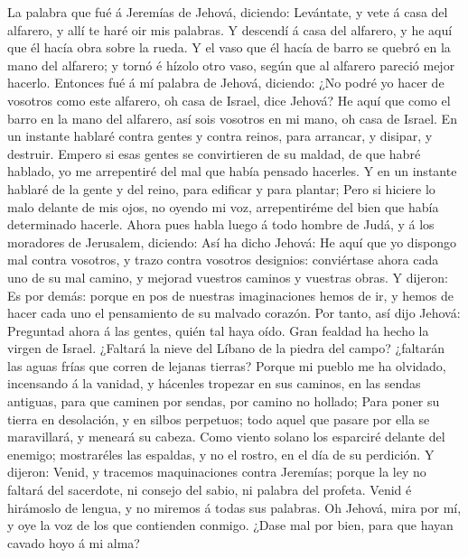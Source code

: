  La palabra que fué á Jeremías de Jehová, diciendo:
 Levántate, y vete á casa del alfarero, y allí te haré oir
mis palabras.  Y descendí á casa del alfarero, y he aquí que
él hacía obra sobre la rueda.  Y el vaso que él hacía de
barro se quebró en la mano del alfarero; y tornó é hízolo otro vaso,
según que al alfarero pareció mejor hacerlo.  Entonces fué á
mí palabra de Jehová, diciendo:  ¿No podré yo hacer de
vosotros como este alfarero, oh casa de Israel, dice Jehová? He aquí que
como el barro en la mano del alfarero, así sois vosotros en mi mano, oh
casa de Israel.  En un instante hablaré contra gentes y
contra reinos, para arrancar, y disipar, y destruir.  Empero
si esas gentes se convirtieren de su maldad, de que habré hablado, yo me
arrepentiré del mal que había pensado hacerles.  Y en un
instante hablaré de la gente y del reino, para edificar y para plantar;
 Pero si hiciere lo malo delante de mis ojos, no oyendo mi
voz, arrepentiréme del bien que había determinado hacerle. 
Ahora pues habla luego á todo hombre de Judá, y á los moradores de
Jerusalem, diciendo: Así ha dicho Jehová: He aquí que yo dispongo mal
contra vosotros, y trazo contra vosotros designios: conviértase ahora
cada uno de su mal camino, y mejorad vuestros caminos y vuestras obras.
 Y dijeron: Es por demás: porque en pos de nuestras
imaginaciones hemos de ir, y hemos de hacer cada uno el pensamiento de
su malvado corazón.  Por tanto, así dijo Jehová: Preguntad
ahora á las gentes, quién tal haya oído. Gran fealdad ha hecho la virgen
de Israel.  ¿Faltará la nieve del Líbano de la piedra del
campo? ¿faltarán las aguas frías que corren de lejanas tierras?
 Porque mi pueblo me ha olvidado, incensando á la vanidad,
y hácenles tropezar en sus caminos, en las sendas antiguas, para que
caminen por sendas, por camino no hollado;  Para poner su
tierra en desolación, y en silbos perpetuos; todo aquel que pasare por
ella se maravillará, y meneará su cabeza.  Como viento
solano los esparciré delante del enemigo; mostraréles las espaldas, y no
el rostro, en el día de su perdición.  Y dijeron: Venid, y
tracemos maquinaciones contra Jeremías; porque la ley no faltará del
sacerdote, ni consejo del sabio, ni palabra del profeta. Venid é
hirámoslo de lengua, y no miremos á todas sus palabras.  Oh
Jehová, mira por mí, y oye la voz de los que contienden conmigo.
 ¿Dase mal por bien, para que hayan cavado hoyo á mi alma?
